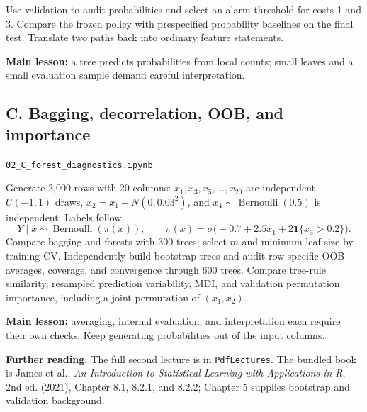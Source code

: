 \documentclass[11pt,a4paper]{article}
\newcommand{\code}[1]{\texttt{\small #1}}
\begin{document}
Use validation to audit probabilities and select an alarm threshold for costs
1 and 3. Compare the frozen policy with prespecified probability baselines
on the final test. Translate two paths back into ordinary feature statements.

\textbf{Main lesson:} a tree predicts probabilities from local counts; small
leaves and a small evaluation sample demand careful interpretation.

\subsection*{C. Bagging, decorrelation, OOB, and importance}
\code{02\_C\_forest\_diagnostics.ipynb}

Generate 2,000 rows with 20 columns: $x_1,x_3,x_5,\ldots,x_{20}$ are
independent $U(-1,1)$ draws, $x_2=x_1+N(0,0.03^2)$, and
$x_4\sim\operatorname{Bernoulli}(0.5)$ is independent. Labels follow
\[
Y\mid x\sim\operatorname{Bernoulli}(\pi(x)),\qquad
\pi(x)=\sigma\bigl(-0.7+2.5x_1+2\mathbf1\{x_3>0.2\}\bigr).
\]
Compare bagging and forests with 300 trees; select $m$ and minimum leaf size
by training CV. Independently build bootstrap trees and audit row-specific
OOB averages, coverage, and convergence through 600 trees. Compare tree-rule
similarity, resampled prediction variability, MDI, and validation permutation
importance, including a joint permutation of $(x_1,x_2)$.

\textbf{Main lesson:} averaging, internal evaluation, and interpretation each
require their own checks. Keep generating probabilities out of the input columns.

\small\textbf{Further reading.} The full second lecture is in \code{PdfLectures}.
The bundled book is James et al., \emph{An Introduction to Statistical Learning
with Applications in R}, 2nd ed. (2021), Chapter 8.1, 8.2.1, and 8.2.2;
Chapter 5 supplies bootstrap and validation background.
\end{document}
